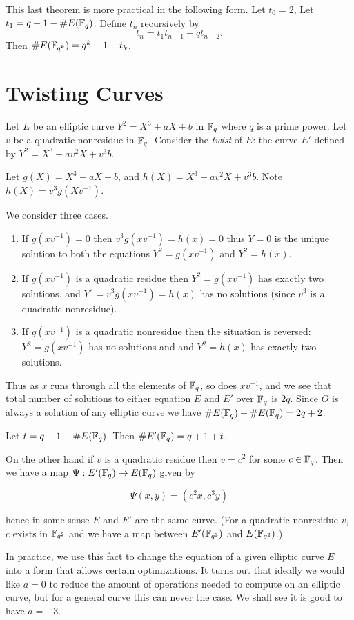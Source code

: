 This last theorem is more practical in the following form. Let $t_0 = 2$,
Let $t_1 = q + 1 - \#E(\mathbb{F}_q)$.
Define $t_n$ recursively by
\[ t_n = t_1 t_{n-1} - q t_{n-2} .\]
Then $\#E(\mathbb{F}_{q^k}) = q^k + 1 - t_k$.

\section {Twisting Curves}

Let $E$ be an elliptic curve $Y^2 = X^3 + a X + b$ in $\mathbb{F}_q$ where
$q$ is a prime power.
Let $v$ be a quadratic nonresidue in $\mathbb{F}_q$. Consider the
\emph{twist} of $E$: the curve $E'$ defined by $Y^2 = X^3 + a v^2 X + v^3 b$.

Let $g(X) = X^3 + a X + b$, and $h(X) = X^3 + a v^2 X + v^3 b$.
Note $h(X) = v^3 g(Xv^{-1})$.

We consider three cases.

\begin{enumerate}
\item
If $g(xv^{-1}) = 0$ then $v^3g(xv^{-1}) = h(x) = 0$ thus
$Y = 0$ is the unique solution to both the
equations $Y^2 = g(xv^{-1})$ and $Y^2 = h(x)$.
\item
If $g(xv^{-1})$ is a quadratic residue then $Y^2 = g(xv^{-1})$
has exactly two solutions,
and $Y^2 = v^3 g(xv^{-1}) = h(x)$ has no solutions (since $v^3$
is a quadratic nonresidue).
\item
If $g(xv^{-1})$ is a quadratic nonresidue then the situation is reversed:
$Y^2 = g(xv^{-1})$ has no solutions and
and $Y^2 = h(x)$ has exactly two solutions.
\end{enumerate}

Thus as $x$ runs through all the elements of $\mathbb{F}_q$, so does $xv^{-1}$,
and we see that total number of solutions to either equation $E$ and $E'$
over $\mathbb{F}_q$ is $2q$.
Since $O$ is always a solution of any elliptic curve we have
$\#E(\mathbb{F}_q) + \#E(\mathbb{F}_q) = 2q + 2$.

Let $t = q + 1 - \#E(\mathbb{F}_q)$. Then $\#E'(\mathbb{F}_q) = q + 1 + t$.

On the other hand if $v$ is a quadratic residue then $v = c^2$ for some
$c \in \mathbb{F}_q$. Then we have a map $\Psi : E'(\mathbb{F}_q) \rightarrow E(\mathbb{F}_q)$
given by

\[ \Psi(x,y) = (c^2 x,c^3 y) \]

hence in some sense $E$ and $E'$ are the same curve. (For a quadratic
nonresidue $v$, $c$ exists in $\mathbb{F}_{q^2}$ and we have a map between
$E'(\mathbb{F}_{q^2})$ and $E(\mathbb{F}_{q^2})$.)

In practice, we use this fact to change the equation of a given elliptic
curve $E$ into a form that allows certain optimizations.
It turns out that ideally we would like $a = 0$ to reduce the amount of
operations needed to compute on an elliptic curve, but for a general curve
this can never the case. We shall see it is good to have $a = -3$.

